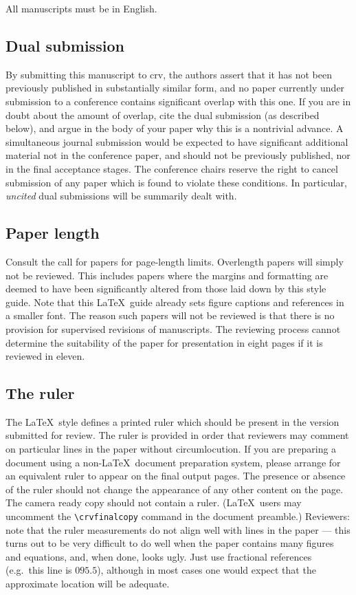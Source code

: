 \documentclass[10pt,twocolumn,letterpaper]{article}
\begin{document}
All manuscripts must be in English.

\subsection{Dual submission}
By submitting this manuscript to crv, the authors assert that it has not
been previously published in substantially similar form, and no paper
currently under submission to a conference contains significant overlap
with this one.  If you are in doubt about the amount of overlap, cite the
dual submission (as described below), and argue in the body of your paper
why this is a nontrivial advance.  A simultaneous journal submission would
be expected to have significant additional material not in the conference
paper, and should not be previously published, nor in the final acceptance
stages. The conference chairs reserve the right to cancel
submission of any paper which is found to violate these conditions.  In
particular, {\em uncited} dual submissions will be summarily dealt with.

\subsection{Paper length}
Consult the call for papers for page-length limits.  Overlength papers will
simply not be reviewed.  This includes papers where the margins and
formatting are deemed to have been significantly altered from those laid
down by this style guide.  Note that this \LaTeX\ guide already sets figure
captions and references in a smaller font.  The reason such papers will not
be reviewed is that there is no provision for supervised revisions of
manuscripts.  The reviewing process cannot determine the suitability of the
paper for presentation in eight pages if it is reviewed in eleven.

\subsection{The ruler}
The \LaTeX\ style defines a printed ruler which should be present in the
version submitted for review.  The ruler is provided in order that
reviewers may comment on particular lines in the paper without
circumlocution.  If you are preparing a document using a non-\LaTeX\
document preparation system, please arrange for an equivalent ruler to
appear on the final output pages.  The presence or absence of the ruler
should not change the appearance of any other content on the page.  The
camera ready copy should not contain a ruler. (\LaTeX\ users may uncomment
the \verb'\crvfinalcopy' command in the document preamble.)  Reviewers:
note that the ruler measurements do not align well with lines in the paper
--- this turns out to be very difficult to do well when the paper contains
many figures and equations, and, when done, looks ugly.  Just use fractional
references (e.g.\ this line is $095.5$), although in most cases one would 
expect that the approximate location will be adequate.
\end{document}

